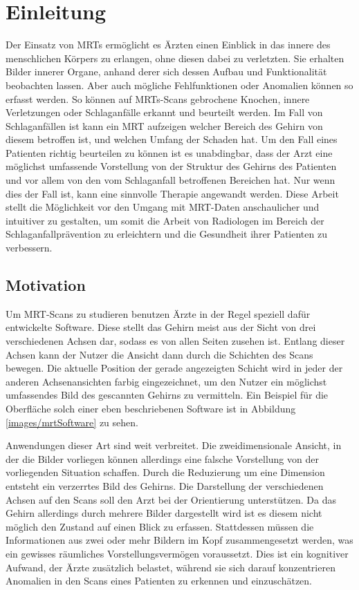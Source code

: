 
\chapter{Einleitung}

Der Einsatz von MRTs ermöglicht es Ärzten einen Einblick in das innere des menschlichen Körpers zu erlangen, ohne diesen dabei zu verletzten. Sie erhalten Bilder innerer Organe, anhand derer sich dessen Aufbau und Funktionalität beobachten lassen. Aber auch mögliche Fehlfunktionen oder Anomalien können so erfasst werden. So können auf MRTs-Scans gebrochene Knochen, innere Verletzungen oder Schlaganfälle erkannt und beurteilt werden. Im Fall von Schlaganfällen ist kann ein MRT aufzeigen welcher Bereich des Gehirn von diesem betroffen ist, und welchen Umfang der Schaden hat.
Um den Fall eines Patienten richtig beurteilen zu können ist es unabdingbar, dass der Arzt eine möglichst umfassende Vorstellung von der Struktur des Gehirns des Patienten und vor allem von den vom Schlaganfall betroffenen Bereichen hat. Nur wenn dies der Fall ist, kann eine sinnvolle Therapie angewandt werden.
Diese Arbeit stellt die Möglichkeit vor den Umgang mit MRT-Daten anschaulicher und intuitiver zu gestalten, um somit die Arbeit von Radiologen im Bereich der Schlaganfallprävention zu erleichtern und die Gesundheit ihrer Patienten zu verbessern.

\section{Motivation}
\label{motivation}

Um MRT-Scans zu studieren benutzen Ärzte in der Regel speziell dafür entwickelte Software. Diese stellt das Gehirn meist aus der Sicht von drei verschiedenen Achsen dar, sodass es von allen Seiten zusehen ist. Entlang dieser Achsen kann der Nutzer die Ansicht dann durch die Schichten des Scans bewegen. Die aktuelle Position der gerade angezeigten Schicht wird in jeder der anderen Achsenansichten farbig eingezeichnet, um den Nutzer ein möglichst umfassendes Bild des gescannten Gehirns zu vermitteln. 
Ein Beispiel für die Oberfläche solch einer eben beschriebenen Software ist in Abbildung \ref{images/mrtSoftware} zu sehen. 

Anwendungen dieser Art sind weit verbreitet. Die zweidimensionale Ansicht, in der die Bilder vorliegen können allerdings eine falsche Vorstellung von der vorliegenden Situation schaffen. 
Durch die Reduzierung um eine Dimension entsteht ein verzerrtes Bild des Gehirns. Die Darstellung der verschiedenen Achsen auf den Scans soll den Arzt bei der Orientierung unterstützen. Da das Gehirn allerdings durch mehrere Bilder dargestellt wird ist es diesem nicht möglich den Zustand auf einen Blick zu erfassen. Stattdessen müssen die Informationen aus zwei oder mehr Bildern im Kopf zusammengesetzt werden, was ein gewisses räumliches Vorstellungsvermögen voraussetzt. Dies ist ein kognitiver Aufwand, der Ärzte zusätzlich belastet, während sie sich darauf konzentrieren Anomalien in den Scans eines Patienten zu erkennen und einzuschätzen. 

